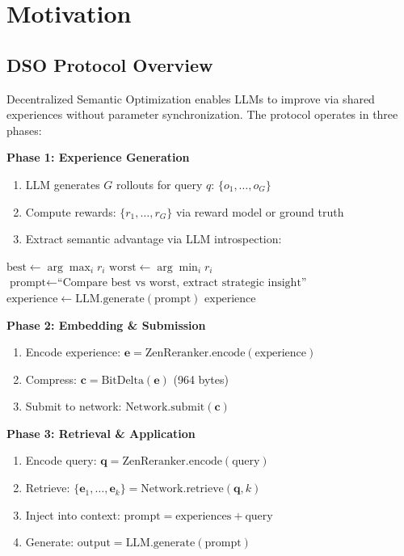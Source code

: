 \section{Motivation}


\subsection{DSO Protocol Overview}

Decentralized Semantic Optimization enables LLMs to improve via shared experiences without parameter synchronization. The protocol operates in three phases:

\textbf{Phase 1: Experience Generation}
\begin{enumerate}
\item LLM generates $G$ rollouts for query $q$: $\{o_1, \ldots, o_G\}$
\item Compute rewards: $\{r_1, \ldots, r_G\}$ via reward model or ground truth
\item Extract semantic advantage via LLM introspection:
\end{enumerate}

\begin{algorithm}[H]
\caption{Semantic Advantage Extraction}
\begin{algorithmic}[1]
\STATE $\text{best} \gets \arg\max_i r_i$
\STATE $\text{worst} \gets \arg\min_i r_i$
\STATE $\text{prompt} \gets \text{``Compare best vs worst, extract strategic insight''}$
\STATE $\text{experience} \gets \text{LLM.generate}(\text{prompt})$
\RETURN $\text{experience}$
\end{algorithmic}
\end{algorithm}

\textbf{Phase 2: Embedding \& Submission}
\begin{enumerate}
\item Encode experience: $\mathbf{e} = \text{ZenReranker.encode}(\text{experience})$
\item Compress: $\mathbf{c} = \text{BitDelta}(\mathbf{e})$ (964 bytes)
\item Submit to network: $\text{Network.submit}(\mathbf{c})$
\end{enumerate}

\textbf{Phase 3: Retrieval \& Application}
\begin{enumerate}
\item Encode query: $\mathbf{q} = \text{ZenReranker.encode}(\text{query})$
\item Retrieve: $\{\mathbf{e}_1, \ldots, \mathbf{e}_k\} = \text{Network.retrieve}(\mathbf{q}, k)$
\item Inject into context: $\text{prompt} = \text{experiences} + \text{query}$
\item Generate: $\text{output} = \text{LLM.generate}(\text{prompt})$
\end{enumerate}

